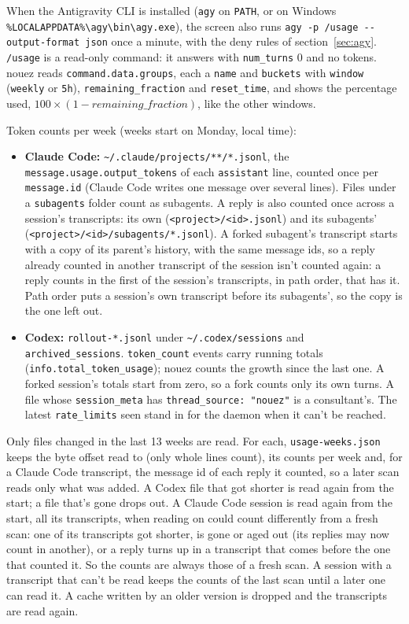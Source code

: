 \documentclass[10pt,a4paper]{article}
\newcommand{\code}[1]{\texttt{#1}}
\begin{document}
When the Antigravity CLI is installed (\code{agy} on \code{PATH}, or on Windows
\code{\%LOCALAPPDATA\%\textbackslash agy\textbackslash bin\textbackslash agy.exe}), the screen also
runs \code{agy -p /usage -{}-output-format json} once a minute, with the deny rules of
section~\ref{sec:agy}. \code{/usage} is a read-only command: it
answers with \code{num\_turns} 0 and no tokens. nouez reads \code{command.data.groups}, each a
\code{name} and \code{buckets} with \code{window} (\code{weekly} or \code{5h}),
\code{remaining\_fraction} and \code{reset\_time}, and shows the percentage used,
$100 \times (1 - \textit{remaining\_fraction})$, like the other windows.

Token counts per week (weeks start on Monday, local time):

\begin{itemize}
\item \textbf{Claude Code:} \code{\textasciitilde/.claude/projects/**/*.jsonl}, the
  \code{message.usage.output\_tokens} of each \code{assistant} line, counted once per
  \code{message.id} (Claude Code writes one message over several lines). Files under a
  \code{subagents} folder count as subagents. A reply is also counted once across a session's
  transcripts: its own (\code{<project>/<id>.jsonl}) and its subagents'
  (\code{<project>/<id>/subagents/*.jsonl}). A forked subagent's transcript starts with a copy of
  its parent's history, with the same message ids, so a reply already counted in another transcript
  of the session isn't counted again: a reply counts in the first of the session's transcripts, in
  path order, that has it. Path order puts a session's own transcript before its subagents', so the
  copy is the one left out.
\item \textbf{Codex:} \code{rollout-*.jsonl} under \code{\textasciitilde/.codex/sessions} and
  \code{archived\_sessions}. \code{token\_count} events carry running totals
  (\code{info.total\_token\_usage}); nouez counts the growth since the last one. A forked session's
  totals start from zero, so a fork counts only its own turns. A file whose
  \code{session\_meta} has \code{thread\_source: "nouez"} is a consultant's. The latest
  \code{rate\_limits} seen stand in for the daemon when it can't be reached.
\end{itemize}

Only files changed in the last 13 weeks are read. For each, \code{usage-weeks.json} keeps the byte
offset read to (only whole lines count), its counts per week and, for a Claude Code transcript,
the message id of each reply it counted, so a later scan reads only what was added. A Codex file
that got shorter is read again from the start; a file that's gone drops out. A Claude Code session
is read again from the start, all its transcripts, when reading on could count differently from a
fresh scan: one of its transcripts got shorter, is gone or aged out (its replies may now count in
another), or a reply turns up in a transcript that comes before the one that counted it. So the
counts are always those of a fresh scan. A session with a transcript that can't be read keeps the
counts of the last scan until a later one can read it. A cache written by an older version is dropped and the
transcripts are read again.
\end{document}
